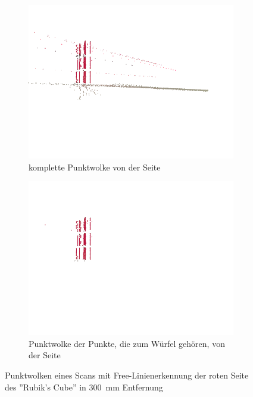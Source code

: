 \documentclass[ngerman,a4paper,parskip=half]{scrartcl}
\begin{document}
\begin{figure}[H]
\begin{subfigure}{0.45\textwidth}
		\includegraphics[width=\textwidth,frame,trim=0 120 0 20,clip]{includes/free_red_pos1.png}
		\caption{komplette Punktwolke von der Seite \\ \mbox{}}
	\end{subfigure}
	\hfill
	\begin{subfigure}{0.45\textwidth}
		\includegraphics[width=\textwidth,frame,trim=0 120 0 20,clip]{includes/free_only_red_pos1.png}
		\caption{Punktwolke der Punkte, die zum Würfel gehören, von der Seite}
	\end{subfigure}
	\caption{Punktwolken eines Scans mit Free-Linienerkennung der roten Seite des ''Rubik's Cube'' in 300~mm Entfernung}
\end{figure}
\end{document}
